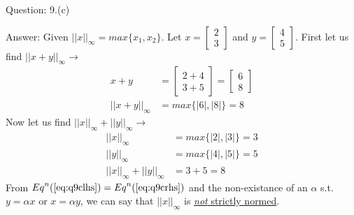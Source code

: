 \documentclass[a4paper]{article}
\begin{document}
\begin{qalist}
		\item[Question: 9.(c)] \setcounter{equation}{0} 
		\item[Answer:] 	Given ${||x||}_{\infty} = max\{{x}_{1},{x}_{2}\}$. Let $x = \begin{bmatrix}2 \\ 3\end{bmatrix}$ and $y=\begin{bmatrix}4 \\ 5\end{bmatrix}$.
			First let us find ${||x+y||}_{\infty} \rightarrow$
			\begin{align}
				x+y &= \begin{bmatrix}2+4 \\ 3+5\end{bmatrix} = \begin{bmatrix}6 \\ 8\end{bmatrix} \\
				{||x+y||}_{\infty} &= max\{|6|,|8|\} = 8\label{eq:q9clhs}
			\end{align}
			Now let us find ${||x||}_{\infty} + {||y||}_{\infty} \rightarrow$
			\begin{align}
				{||x||}_{\infty} &= max\{|2|,|3|\} = 3 \\
				{||y||}_{\infty} &= max\{|4|,|5|\} = 5 \\
				{||x||}_{\infty} + {||y||}_{\infty} &= 3+5 = 8 \label{eq:q9crhs}
			\end{align}
			From ${Eq}^{n}(\ref{eq:q9clhs}) = {Eq}^{n}(\ref{eq:q9crhs})$ and the non-existance of an $\alpha$ s.t. $y=\alpha x$ or $x = \alpha y $, we can say that ${||x||}_{\infty}$ is \underline{\emph{not} strictly normed}.
	\end{qalist}
\end{document}
